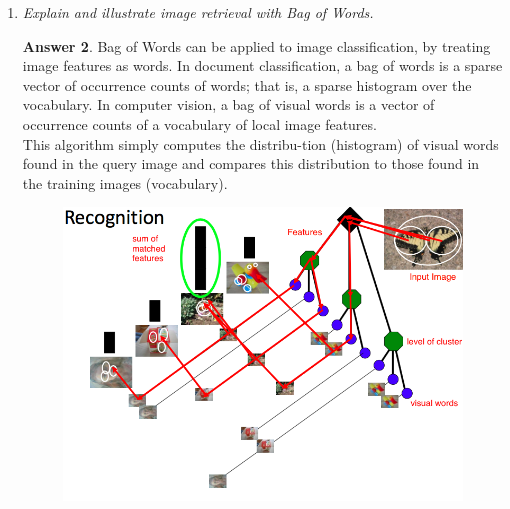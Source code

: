 \documentclass[a4paper,12 pt]{article}
\theoremstyle{definition}
\theoremstyle{remark}
\theoremstyle{definition}
\theoremstyle{definition}
\theoremstyle{definition}
\theoremstyle{definition}
\theoremstyle{remark}
\theoremstyle{remark}
\theoremstyle{definition}
\theoremstyle{definition}
\newtheorem*{answer}{Answer}
\begin{document}
\begin{enumerate}
\begin{answer}
\begin{equation}
D(X,M)=\sum_{i=1}^k\sum_{x \in S_i}(x-m_i)^2.
\end{equation}
The algorithm reads
\begin{enumerate}
\item Randomly initialize $k$ cluster centers
\item Iterate until convergence:
\begin{itemize}
\item Assign each data point $x_i$ to the nearest center $m_i$.
\item Recompute each cluster center as the mean of all points assigned to it.
\end{itemize}
\end{enumerate}
\end{answer}
\item \textit{ Explain and illustrate image retrieval with Bag of Words. }
\begin{answer}
Bag of Words can be applied to image classification, by treating image features as words. In document classification, a bag of words is a sparse vector of occurrence counts of words; that is, a sparse histogram over the vocabulary. In computer vision, a bag of visual words is a vector of occurrence counts of a vocabulary of local image features. \\
This algorithm simply computes the distribu-tion (histogram) of visual words found in the query image and compares this distribution to those found in the training images (vocabulary). 
\begin{figure}[h!]
\begin{center}
\includegraphics[scale=0.35]{pics/bowretrieval}

\end{center}
\end{figure}
\end{answer}
\end{enumerate}
\end{document}
